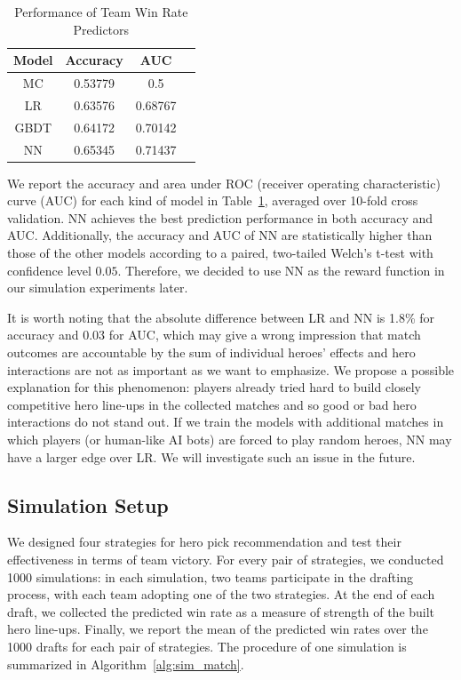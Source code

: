 \begin{table}
  \caption{Performance of Team Win Rate Predictors}
  \centering
  \label{tab:auc}
  \begin{tabular}{c@{\hskip 0.5in}c@{\hskip 0.36in}c@{\hskip 0.36in}c}
    \toprule
    Model  & Accuracy & AUC  \\
    \midrule
    MC   & 0.53779        & 0.5       \\
    LR   & 0.63576        & 0.68767    \\
    GBDT & 0.64172        & 0.70142   \\
	NN   & 0.65345        & 0.71437  \\
  \bottomrule
\end{tabular}
\end{table}


We report the accuracy and area under ROC (receiver operating characteristic) curve (AUC) for each kind of model in Table~\ref{tab:auc}, averaged over 10-fold cross validation. NN achieves the best prediction performance in both accuracy and AUC. Additionally, the accuracy and AUC of NN are statistically higher than those of the other models according to a paired, two-tailed Welch's t-test with confidence level $0.05$. Therefore, we decided to use NN as the reward function in our simulation experiments later. 


It is worth noting that the absolute difference between LR and NN is 1.8\% for accuracy and 0.03 for AUC, which may give a wrong impression that match outcomes are accountable by the sum of individual heroes' effects and hero interactions are not as important as we want to emphasize. We propose a possible explanation for this phenomenon: players already tried hard to build closely competitive hero line-ups in the collected matches and so good or bad hero interactions do not stand out. If we train the models with additional matches in which players (or human-like AI bots) are forced to play random heroes, NN may have a larger edge over LR. We will investigate such an issue in the future.




\subsection{Simulation Setup}
We designed four strategies for hero pick recommendation and test their effectiveness in terms of team victory. For every pair of strategies, we conducted 1000 simulations: in each simulation, two teams participate in the drafting process, with each team adopting one of the two strategies. At the end of each draft, we collected the predicted win rate as a measure of strength of the built hero line-ups. Finally, we report the mean of the predicted win rates over the 1000 drafts for each pair of strategies. The procedure of one simulation is summarized in Algorithm~\ref{alg:sim_match}.

